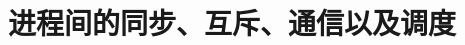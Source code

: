 \documentclass[xcolor=svgnames]{beamer}
\begin{document}
\begin{CJK*}{UTF8}{gbsn}


\title{进程间的同步、互斥、通信以及调度}





\end{CJK*}
\end{document}
